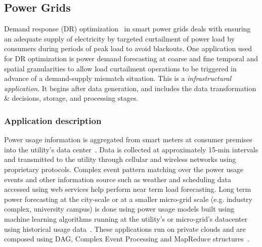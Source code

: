 


\subsection{Power Grids \label{power}}

%



Demand response (DR) optimization~\cite{ferc2011DR} in smart power
grids deals with ensuring an adequate supply of electricity by
targeted curtailment of power load by consumers during periods of peak
load to avoid blackouts. One application used for DR optimization is
power demand forecasting at coarse and fine temporal and spatial
granularities to allow load curtailment operations to be triggered in
advance of a demand-supply mismatch situation.  This is a {\em
  infrastructural application}.  It begins after data generation, and
includes the data transformation \& decisions, storage, and processing
stages.

\subsubsection*{Application description}


Power usage information is aggregated from smart meters at consumer premises into the utility's data center~\cite{Simmhan:buildsys:2011,simmhan2011TR}. Data is collected at approximately 15-min intervals and transmitted to the utility through cellular and wireless networks using proprietary protocols. Complex event pattern matching over the power usage events and other information source such as weather and scheduling data accessed using web services help perform near term load forecasting. Long term power forecasting at the city-scale or at a smaller micro-grid scale (e.g. industry complex, university campus) is done using power usage models built using machine learning algorithms running at the utility's or micro-grid's datacenter using historical usage data~\cite{Aman:dddm:2011}. These applications run on private clouds and are composed using DAG, Complex Event Processing and MapReduce structures~\cite{zhou:2012:scepter}.

